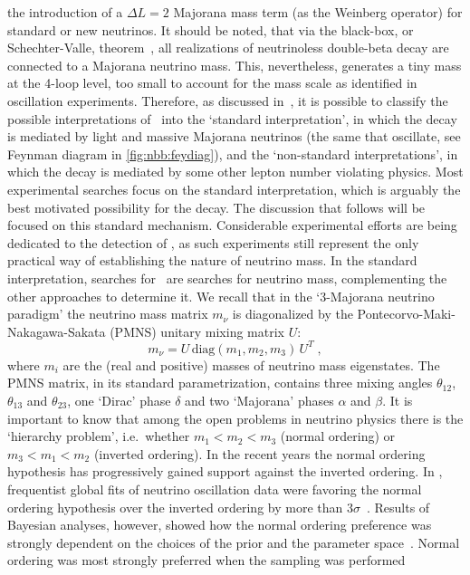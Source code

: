the introduction of a $\Delta L = 2$ Majorana mass term (as the Weinberg operator) for
standard or new neutrinos.  It should be noted, that via the black-box, or
Schechter-Valle, theorem~\cite{Schechter1982}, all realizations of neutrinoless
double-beta decay are connected to a Majorana neutrino mass. This, nevertheless, generates a
tiny mass at the 4-loop level, too small to account for the mass scale as identified in
oscillation experiments.  Therefore, as discussed in~\cite{Rodejohann2011}, it is possible
to classify the possible interpretations of \onbb\ into the `standard interpretation', in
which the decay is mediated by light and massive Majorana neutrinos (the same that
oscillate, see Feynman diagram in \cref{fig:nbb:feydiag}), and the `non-standard
interpretations', in which the decay is mediated by some other lepton number violating
physics. Most experimental searches focus on the standard interpretation, which is
arguably the best motivated possibility for the decay. The discussion that follows will be
focused on this standard mechanism. Considerable experimental efforts are being dedicated
to the detection of \onbb, as such experiments still represent the only practical way of
establishing the nature of neutrino mass.
\newpar
In the standard interpretation, searches for \onbb\ are searches for neutrino mass,
complementing the other approaches to determine it. We recall that in the `3-Majorana
neutrino paradigm' the neutrino mass matrix $m_\nu$ is diagonalized by the
Pontecorvo-Maki-Nakagawa-Sakata (PMNS) unitary mixing matrix $U$:
\[
  m_\nu = U \, \text{diag}(m_1, m_2, m_3) \, U^T \;,
\]
where $m_i$ are the (real and positive) masses of neutrino mass eigenstates.  The PMNS
matrix, in its standard parametrization, contains three mixing angles $\theta_{12}$,
$\theta_{13}$ and $\theta_{23}$, one `Dirac' phase $\delta$ and two `Majorana' phases
$\alpha$ and $\beta$. It is important to know that among the open problems in neutrino
physics there is the `hierarchy problem', i.e.~whether $m_1 < m_2 < m_3$ (normal ordering)
or $m_3 < m_1 < m_2$ (inverted ordering).  In the recent years the normal ordering
hypothesis has progressively gained support against the inverted ordering. In ,
frequentist global fits of neutrino oscillation data were favoring the normal ordering
hypothesis over the inverted ordering by more than $3\sigma$~\cite{Esteban2019}. Results
of Bayesian analyses, however, showed how the normal ordering preference was strongly
dependent on the choices of the prior and the parameter space~\cite{Hannestad2016,
Schwetz2017}. Normal ordering was most strongly preferred when the sampling was performed
